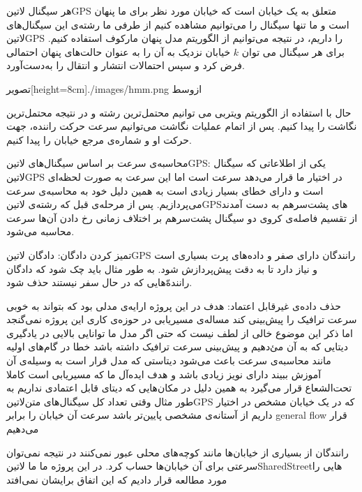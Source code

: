 هر سیگنال ‌لاتین{GPS} متعلق به یک خیابان است که خیابان مورد نظر برای ما پنهان است و ما تنها سیگنال را می‌توانیم مشاهده کنیم
از طرفی ما رشته‌ی این سیگنال‌های ‌لاتین{GPS} را داریم، در نتیجه می‌توانیم از الگوریتم مدل پنهان مارکوف  استفاده کنیم.
برای هر سیگنال می توان $k$ خیابان نزدیک به آن را به عنوان حالت‌های پنهان احتمالی فرض کرد و سپس احتمالات انتشار و انتقال را به‌دست‌آورد.

  ‌تصویر[height=8cm]{./images/hmm.png}
  ‌ازوسط

حال با استفاده از الگوریتم ویتربی می توانیم محتمل‌ترین رشته و در نتیجه محتمل‌ترین نگاشت را پیدا کنیم.
پس از اتمام عملیات نگاشت می‌توانیم سرعت حرکت راننده، جهت حرکت او و شماره‌ی مرجع خیابان  را پیدا کنیم.

 محاسبه‌ی سرعت بر اساس سیگنال‌های ‌لاتین{GPS}: یکی از اطلاعاتی که سیگنال ‌لاتین{GPS} در اختیار ما قرار می‌دهد سرعت است اما این سرعت به صورت لحظه‌ای است و دارای خطای بسیار زیادی است به همین دلیل خود به محاسبه‌ی سرعت می‌پردازیم. پس از مرحله‌ی قبل که رشته‌ی ‌لاتین{GPS}های پشت‌سر‌هم به دست آمدند از تقسیم فاصله‌ی کروی دو سیگنال پشت‌سر‌هم بر اختلاف زمانی رخ دادن آن‌ها سرعت محاسبه می‌شود.


 تمیز کردن دادگان: دادگان ‌لاتین{GPS} رانندگان دارای صفر و داده‌های پرت بسیاری است و نیاز دارد تا به دقت پیش‌پردازش شود. به طور مثال باید چک شود که دادگان راننده‌ّهایی که در حال سفر نیستند حذف شود.

 حذف داده‌ی غیرقابل اعتماد: هدف در این پروژه ارایه‌ی مدلی بود که بتواند به خوبی سرعت ترافیک را پیش‌بینی کند مساله‌ی مسیریابی در حوزه‌ی کاری این پروژه نمی‌گنجد اما ذکر این موضوع خالی از لطف نیست که حتی اگر مدل ما توانایی بالایی در یادگیری دیتایی که به آن می‌ٔدهیم و پیش‌بینی سرعت ترافیک داشته باشد خطا در گام‌های اولیه مانند محاسبه‌ی سرعت باعث می‌شود دیتاستی که مدل قرار است به وسیله‌ی آن آموزش ببیند دارای نویز زیادی باشد و هدف ایده‌آل ما که مسیریابی است کاملا تحت‌الشعاع قرار می‌گیرد به همین دلیل در مکان‌هایی که دیتای قابل اعتمادی نداریم به طور مثال وقتی تعداد کل سیگنال‌های متن‌لاتین{GPS} که در یک خیابان مشخص در اختیار داریم از آستانه‌ی مشخصی پایین‌تر باشد سرعت آن خیابان را برابر general flow قرار می‌دهیم

 رانندگان از بسیاری از خیابان‌ها مانند کوچه‌های محلی  عبور نمی‌کنند در نتیجه نمی‌توان سرعتی برای آن خیابان‌ها حساب کرد. در این پروژه ما ما  لاتین{SharedStreet}‌هایی را مورد مطالعه قرار دادیم که این اتفاق برایشان نمی‌افتد

